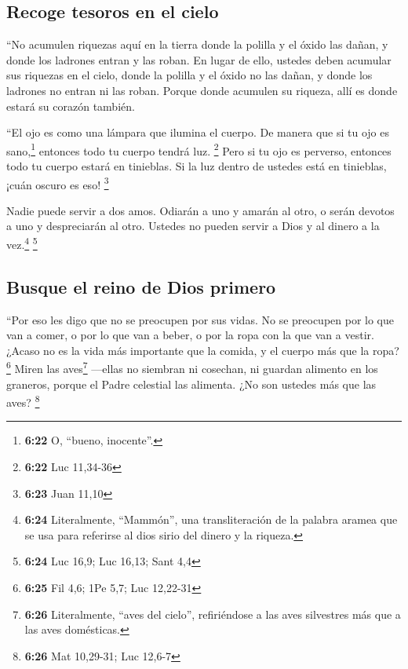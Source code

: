 \hypertarget{recoge-tesoros-en-el-cielo}{%
\subsection{Recoge tesoros en el
cielo}\label{recoge-tesoros-en-el-cielo}}

 ``No acumulen riquezas aquí en la tierra donde la
polilla y el óxido las dañan, y donde los ladrones entran y las roban.
 En lugar de ello, ustedes deben acumular sus riquezas en
el cielo, donde la polilla y el óxido no las dañan, y donde los ladrones
no entran ni las roban.  Porque donde acumulen su
riqueza, allí es donde estará su corazón también.

 ``El ojo es como una lámpara que ilumina el cuerpo. De
manera que si tu ojo es sano,\footnote{\textbf{6:22} O, ``bueno,
  inocente''.} entonces todo tu cuerpo tendrá luz. \footnote{\textbf{6:22}
  Luc 11,34-36}  Pero si tu ojo es perverso, entonces
todo tu cuerpo estará en tinieblas. Si la luz dentro de ustedes está en
tinieblas, ¡cuán oscuro es eso! \footnote{\textbf{6:23} Juan 11,10}

 Nadie puede servir a dos amos. Odiarán a uno y amarán al
otro, o serán devotos a uno y despreciarán al otro. Ustedes no pueden
servir a Dios y al dinero a la vez.\footnote{\textbf{6:24} Literalmente,
  ``Mammón'', una transliteración de la palabra aramea que se usa para
  referirse al dios sirio del dinero y la riqueza.} \footnote{\textbf{6:24}
  Luc 16,9; Luc 16,13; Sant 4,4}

\hypertarget{busque-el-reino-de-dios-primero}{%
\subsection{Busque el reino de Dios
primero}\label{busque-el-reino-de-dios-primero}}

 ``Por eso les digo que no se preocupen por sus vidas. No
se preocupen por lo que van a comer, o por lo que van a beber, o por la
ropa con la que van a vestir. ¿Acaso no es la vida más importante que la
comida, y el cuerpo más que la ropa? \footnote{\textbf{6:25} Fil 4,6;
  1Pe 5,7; Luc 12,22-31}  Miren las aves\footnote{\textbf{6:26}
  Literalmente, ``aves del cielo'', refiriéndose a las aves silvestres
  más que a las aves domésticas.} ---ellas no siembran ni cosechan, ni
guardan alimento en los graneros, porque el Padre celestial las
alimenta. ¿No son ustedes más que las aves? \footnote{\textbf{6:26} Mat
  10,29-31; Luc 12,6-7}

